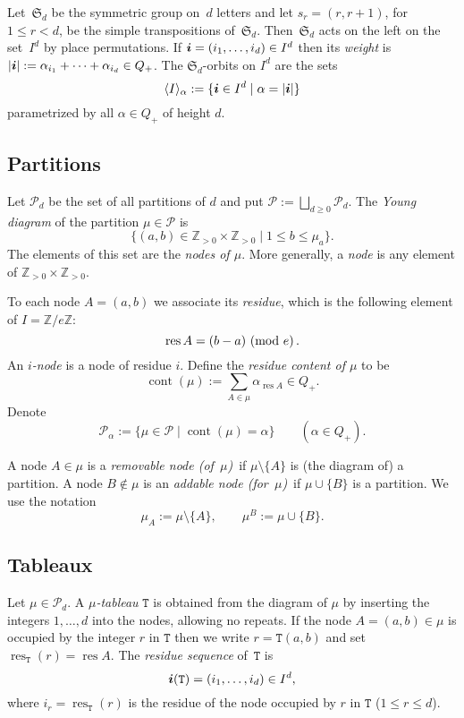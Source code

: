 \documentclass[twoside,11pt,reqno,letter]{amsart}
\numberwithin{equation}{section}
\theoremstyle{definition}  %
\def\bi{\text{\boldmath$i$}}
\def\pmod#1{\text{ }(\text{\rm mod } #1)\,}
\newcommand{\words}{\langle I \rangle}
\newcommand{\res}{\operatorname{res}}
\newcommand{\cont}{\operatorname{cont}}
\newcommand{\Z}{\mathbb{Z}}
\newcommand{\0}{{\bar 0}}
\newcommand{\1}{{\bar 1}}
\newcommand{\al}{\alpha}
\def\Si{\mathfrak{S}}
\newcommand\Par{\mathscr P}
\def\T{{\mathtt T}}
\begin{document}
Let~$\Si_d$ be the symmetric group on~$d$ letters and let $s_r = (r, r+1)$, for $1\leq r < d$, be the simple transpositions of~$\Si_d$. Then~$\Si_d$ acts on the left on the set~$I^d$ by place permutations.
If $\bi = (i_1, \dots , i_d) \in I^d$ then its {\em weight} is
$|\bi| := \alpha_{i_1} + \cdots + \alpha_{i_d} \in Q_+$.  The $\Si_d$-orbits on $I^d$ are the sets 
\[
  \words_\alpha := \{\bi \in I^d\mid \al=|\bi|\} 
\]
parametrized by all $\alpha \in Q_+$ of height $d$.


\subsection{Partitions}\label{SSPar}
Let $\Par_d$ be the set of all partitions of $d$ and put $\Par:=\bigsqcup_{d\geq 0}\Par_d$. 
The {\em Young diagram} of the partition $\mu\in \Par$ is 
$$
\{(a,b)\in\Z_{>0}\times\Z_{>0}\mid 1\leq b\leq \mu_a\}.
$$
The elements of this set
are the {\em nodes of $\mu$}. More generally, a {\em node} is any element of $\Z_{>0}\times\Z_{>0}$. 

To each node $A=(a,b)$ 
we associate its {\em residue}, which is the following element of $I=\Z/e\Z$: 
\begin{equation}\label{ERes}
\res A=(b-a)\pmod{e}.
\end{equation}
An {\em $i$-node} is a node of residue $i$.
Define the {\em residue content of $\mu$} to be
\begin{equation}\label{EContent}
\cont(\mu):=\sum_{A\in\mu}\al_{\res A} \in Q_+.
\end{equation}
Denote
$$
\Par_\al:=\{\mu\in\Par\mid \cont(\mu)=\al\}\qquad(\al\in Q_+).
$$

A node $A\in\mu$ is a {\em removable node (of~$\mu$)}\, if $\mu\setminus \{A\}$ is (the diagram of) a partition. A node $B\not\in\mu$ is an {\em addable node (for~$\mu$)}\, if $\mu\cup \{B\}$ is a partition. We use the notation
$$
\mu_A:=\mu\setminus \{A\},\qquad \mu^B:=\mu\cup\{B\}.
$$




\subsection{Tableaux}\label{SS:tableaux}
Let $\mu\in\Par_d$. 
A {\em $\mu$-tableau} $\T$ is obtained from the diagram of $\mu$ by 
inserting the integers $1,\dots,d$ into the nodes, allowing no repeats. 
If the node $A=(a,b)\in\mu$ is occupied by the integer $r$ in $\T$ then we write $r=\T(a,b)$ and set
$\res_\T(r)=\res A$. The {\em residue sequence} of~$\T$ is
\begin{equation}\label{EResSeq}
\bi(\T)=(i_1,\dots,i_d)\in I^d,
\end{equation}
where $i_r=\res_\T(r)$ is the residue of the node occupied by 
$r$ in $\T$ ($1\leq r\leq d$). 
\end{document}
